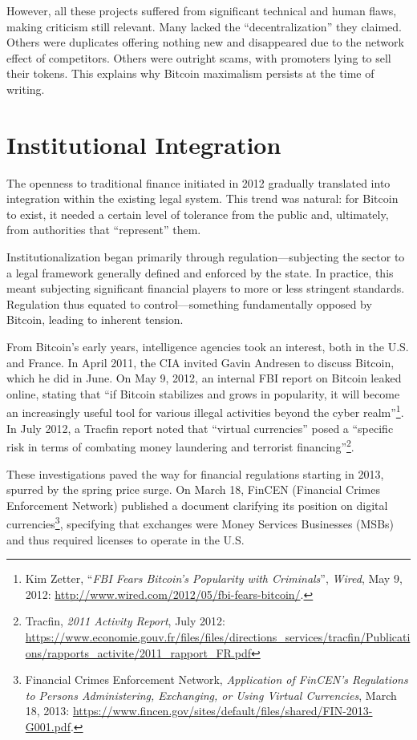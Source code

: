 \documentclass[
  a5paper,
  smalldemyvopaper,10pt,twoside,onecolumn,openright,extrafontsizes,hidelinks]{memoir}
\begin{document}
However, all these projects suffered from significant technical and
human flaws, making criticism still relevant. Many lacked the
``decentralization'' they claimed. Others were duplicates offering
nothing new and disappeared due to the network effect of competitors.
Others were outright scams, with promoters lying to sell their tokens.
This explains why Bitcoin maximalism persists at the time of writing.

\section*{Institutional
Integration}\label{lintuxe9gration-institutionnelle}


The openness to traditional finance initiated in 2012 gradually
translated into integration within the existing legal system. This trend
was natural: for Bitcoin to exist, it needed a certain level of
tolerance from the public and, ultimately, from authorities that
``represent'' them.

Institutionalization began primarily through regulation---subjecting the
sector to a legal framework generally defined and enforced by the state.
In practice, this meant subjecting significant financial players to more
or less stringent standards. Regulation thus equated to
control---something fundamentally opposed by Bitcoin, leading to
inherent tension.

From Bitcoin's early years, intelligence agencies took an interest, both
in the U.S. and France. In April 2011, the CIA invited Gavin Andresen to
discuss Bitcoin, which he did in June. On May 9, 2012, an internal FBI
report on Bitcoin leaked online, stating that ``if Bitcoin stabilizes
and grows in popularity, it will become an increasingly useful tool for
various illegal activities beyond the cyber realm''\footnote{Kim Zetter,
  ``\emph{FBI Fears Bitcoin's Popularity with Criminals}'',
  \emph{Wired}, May 9, 2012:
  \url{http://www.wired.com/2012/05/fbi-fears-bitcoin/}.}. In July 2012,
a Tracfin report noted that ``virtual currencies'' posed a ``specific
risk in terms of combating money laundering and terrorist
financing''\footnote{Tracfin, \emph{2011 Activity Report}, July 2012:
  \url{https://www.economie.gouv.fr/files/files/directions_services/tracfin/Publications/rapports_activite/2011_rapport_FR.pdf}}.

These investigations paved the way for financial regulations starting in
2013, spurred by the spring price surge. On March 18, FinCEN (Financial
Crimes Enforcement Network) published a document clarifying its position
on digital currencies\footnote{Financial Crimes Enforcement Network,
  \emph{Application of FinCEN's Regulations to Persons Administering,
  Exchanging, or Using Virtual Currencies}, March 18, 2013:
  \url{https://www.fincen.gov/sites/default/files/shared/FIN-2013-G001.pdf}.},
specifying that exchanges were Money Services Businesses (MSBs) and thus
required licenses to operate in the U.S.
\end{document}
